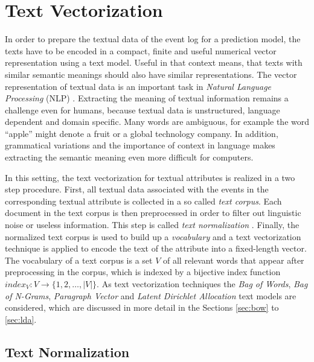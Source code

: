 \section{Text Vectorization}\label{sec:text}

In order to prepare the textual data of the event log for a prediction model, the texts have to be encoded in a compact, finite and useful numerical vector representation using a text model.
Useful in that context means, that texts with similar semantic meanings should also have similar representations.
The vector representation of textual data is an important task in \textit{Natural Language Processing} (NLP) \cite{DBLP:books/daglib/0001548}.
Extracting the meaning of textual information remains a challenge even for humans, because textual data is unstructured, language dependent and domain specific.
Many words are ambiguous, for example the word \enquote{apple} might denote a fruit or a global technology company.
In addition, grammatical variations and the importance of context in language makes extracting the semantic meaning even more difficult for computers.

In this setting, the text vectorization for textual attributes is realized in a two step procedure.
First, all textual data associated with the events in the corresponding textual attribute is collected in a so called \textit{text corpus}.
Each document in the text corpus is then preprocessed in order to filter out linguistic noise or useless information.
This step is called \textit{text normalization}  \cite{DBLP:books/lib/JurafskyM09}.
Finally, the normalized text corpus is used to build up a \textit{vocabulary} and a text vectorization technique is applied to encode the text of the attribute into a fixed-length vector.
The vocabulary of a text corpus is a set $V$ of all relevant words that appear after preprocessing in the corpus, which is indexed by a bijective index function $index_V \colon V \to \{1, 2, \dots, |V|\}$.
As text vectorization techniques the \textit{Bag of Words}, \textit{Bag of N-Grams}, \textit{Paragraph Vector} and \textit{Latent Dirichlet Allocation} text models are considered, which are discussed in more detail in the Sections \ref{sec:bow} to \ref{sec:lda}.

\subsection{Text Normalization}

